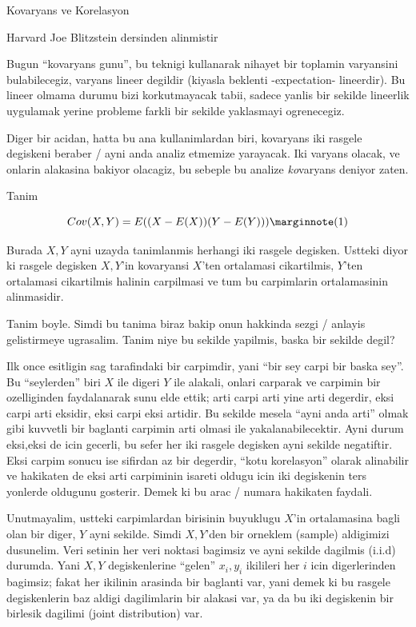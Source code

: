 \documentclass[12pt,fleqn]{article}\usepackage{../common}
\begin{document}
Kovaryans ve Korelasyon

Harvard Joe Blitzstein dersinden alinmistir

Bugun ``kovaryans gunu'', bu teknigi kullanarak nihayet bir toplamin
varyansini bulabilecegiz, varyans lineer degildir (kiyasla beklenti
-expectation- lineerdir). Bu lineer olmama durumu bizi korkutmayacak tabii,
sadece yanlis bir sekilde lineerlik uygulamak yerine probleme farkli bir
sekilde yaklasmayi ogrenecegiz. 

Diger bir acidan, hatta bu ana kullanimlardan biri, kovaryans iki rasgele
degiskeni beraber / ayni anda analiz etmemize yarayacak. Iki varyans
olacak, ve onlarin alakasina bakiyor olacagiz, bu sebeple bu analize {\em
  ko}varyans deniyor zaten. 

Tanim

$$ Cov(X,Y) = E((X-E(X))(Y-E(Y))) \mlabel{1} $$

Burada $X,Y$ ayni uzayda tanimlanmis herhangi iki rasgele degisken. Ustteki
diyor ki rasgele degisken $X,Y$'in kovaryansi $X$'ten ortalamasi
cikartilmis, $Y$'ten ortalamasi cikartilmis halinin carpilmasi ve tum bu
carpimlarin ortalamasinin alinmasidir.

Tanim boyle. Simdi bu tanima biraz bakip onun hakkinda sezgi / anlayis
gelistirmeye ugrasalim. Tanim niye bu sekilde yapilmis, baska bir sekilde
degil?

Ilk once esitligin sag tarafindaki bir carpimdir, yani ``bir sey carpi bir
baska sey''. Bu ``seylerden'' biri $X$ ile digeri $Y$ ile alakali, onlari
carparak ve carpimin bir ozelliginden faydalanarak sunu elde ettik; arti
carpi arti yine arti degerdir, eksi carpi arti eksidir, eksi carpi eksi
artidir. Bu sekilde mesela ``ayni anda arti'' olmak gibi kuvvetli bir
baglanti carpimin arti olmasi ile yakalanabilecektir. Ayni durum eksi,eksi
de icin gecerli, bu sefer her iki rasgele degisken ayni sekilde
negatiftir. Eksi carpim sonucu ise sifirdan az bir degerdir, ``kotu
korelasyon'' olarak alinabilir ve hakikaten de eksi arti carpiminin isareti
oldugu icin iki degiskenin ters yonlerde oldugunu gosterir. Demek ki bu
arac / numara hakikaten faydali.

Unutmayalim, ustteki carpimlardan birisinin buyuklugu $X$'in ortalamasina
bagli olan bir diger, $Y$ ayni sekilde. Simdi $X,Y$'den bir orneklem
(sample) aldigimizi dusunelim. Veri setinin her veri noktasi bagimsiz ve
ayni sekilde dagilmis (i.i.d) durumda. Yani $X,Y$ degiskenlerine ``gelen''
$x_i,y_i$ ikilileri her $i$ icin digerlerinden bagimsiz; fakat her ikilinin
arasinda bir baglanti var, yani demek ki bu rasgele degiskenlerin baz
aldigi dagilimlarin bir alakasi var, ya da bu iki degiskenin bir birlesik
dagilimi (joint distribution) var.
\end{document}
